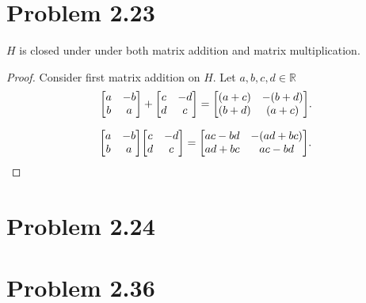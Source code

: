 \documentclass[12pt]{extarticle}
\begin{document}
\section*{Problem 2.23}

$H$ is closed under under both matrix addition and matrix multiplication.

\begin{proof}
	Consider first matrix addition on $H$. Let $a,b,c,d \in \mathbb{R}$
\[
	\mqty[a & -b \\ b & a] + \mqty[c & -d \\ d & c] = \mqty[(a+c) & - (b + d) \\ (b + d) & (a + c)]
.\]

\[
	\mqty[a & -b \\ b & a] \mqty[c & -d \\ d & c] =
	\mqty[
	ac - bd & -(ad + bc) \\
	ad + bc & ac - bd
	]
.\]
\end{proof}


\section*{Problem 2.24}
\section*{Problem 2.36}
\end{document}
